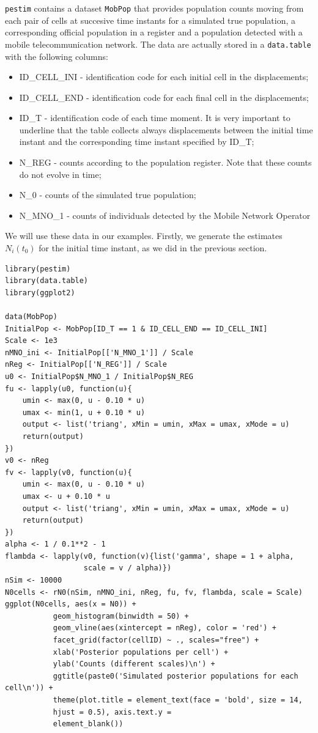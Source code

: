\documentclass[12pt, a4paper]{article}
\begin{document}
\texttt{pestim} contains a dataset \texttt{MobPop} that provides population counts moving from 
each pair of cells at succesive time instants for a simulated true population, a corresponding official
population in a register and a population detected with a mobile telecommunication network. The data
are actually stored in a \texttt{data.table} with the following columns:
\begin{itemize}
\item ID\_CELL\_INI - identification code for each initial cell in the displacements;
\item ID\_CELL\_END - identification code for each final cell in the displacements;
\item ID\_T - identification code of each time moment. It is very important to underline that the 
table collects always displacements between the initial time instant and the corresponding time instant specified by ID\_T;
\item N\_REG - counts according to the population register. Note that these counts do not evolve in time;
\item N\_0 - counts of the simulated true population;
\item N\_MNO\_1 - counts of individuals detected by the Mobile Network Operator
\end{itemize}

We will use these data in our examples. Firstly, we generate the estimates $N_{i}(t_{0})$ for the 
initial time instant, as we  did in the previous section.

\begin{verbatim}
library(pestim)
library(data.table)
library(ggplot2)

data(MobPop)
InitialPop <- MobPop[ID_T == 1 & ID_CELL_END == ID_CELL_INI]
Scale <- 1e3
nMNO_ini <- InitialPop[['N_MNO_1']] / Scale
nReg <- InitialPop[['N_REG']] / Scale
u0 <- InitialPop$N_MNO_1 / InitialPop$N_REG
fu <- lapply(u0, function(u){
    umin <- max(0, u - 0.10 * u)
    umax <- min(1, u + 0.10 * u)
    output <- list('triang', xMin = umin, xMax = umax, xMode = u)
    return(output)
})
v0 <- nReg
fv <- lapply(v0, function(u){
    umin <- max(0, u - 0.10 * u)
    umax <- u + 0.10 * u
    output <- list('triang', xMin = umin, xMax = umax, xMode = u)
    return(output)
})
alpha <- 1 / 0.1**2 - 1
flambda <- lapply(v0, function(v){list('gamma', shape = 1 + alpha, 
                  scale = v / alpha)})
nSim <- 10000
N0cells <- rN0(nSim, nMNO_ini, nReg, fu, fv, flambda, scale = Scale)
ggplot(N0cells, aes(x = N0)) + 
           geom_histogram(binwidth = 50) +
           geom_vline(aes(xintercept = nReg), color = 'red') +
           facet_grid(factor(cellID) ~ ., scales="free") +
           xlab('Posterior populations per cell') + 
           ylab('Counts (different scales)\n') +
           ggtitle(paste0('Simulated posterior populations for each cell\n')) +
           theme(plot.title = element_text(face = 'bold', size = 14, 
           hjust = 0.5), axis.text.y =
           element_blank())
\end{verbatim}
\end{document}
